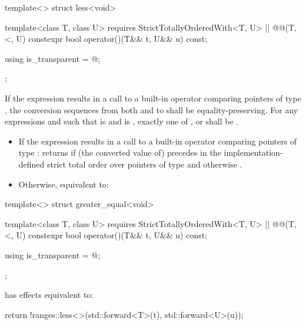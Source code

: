 {%
\begin{itemdecl}
template<> struct less<void> {
  template<class T, class U>
    requires StrictTotallyOrderedWith<T, U> || @\textit{}@(T, <, U)
  constexpr bool operator()(T&& t, U&& u) const;

  using is_transparent = @\unspecnc@;
};
\end{itemdecl}

\begin{itemdescr}
\pnum
\oldtxt{\requires} \newtxt{\expects}
If the expression  results in a
call to a built-in operator \tcode{<} comparing pointers of type , the
conversion sequences from both  and  to  shall be
equality-preserving. For any expressions
 and  such that  is  and
 is , exactly one of ,
 or  shall be
.

\pnum
\effects
\begin{itemize}
\item
If the expression  results in a
call to a built-in operator \tcode{<} comparing pointers of type :
returns  if (the converted value of)  precedes  in
the implementation-defined strict total order over pointers of type 
and otherwise .

\item
Otherwise, equivalent to: 
\end{itemize}
\end{itemdescr}

%
\begin{itemdecl}
template<> struct greater_equal<void> {
  template<class T, class U>
    requires StrictTotallyOrderedWith<T, U> || @\textit{}@(T, <, U)
  constexpr bool operator()(T&& t, U&& u) const;

  using is_transparent = @\unspecnc@;
};
\end{itemdecl}

\begin{itemdescr}
\pnum
{} has effects equivalent to:
\begin{codeblock}
return !ranges::less<>{}(std::forward<T>(t), std::forward<U>(u));
\end{codeblock}
\end{itemdescr}

}
